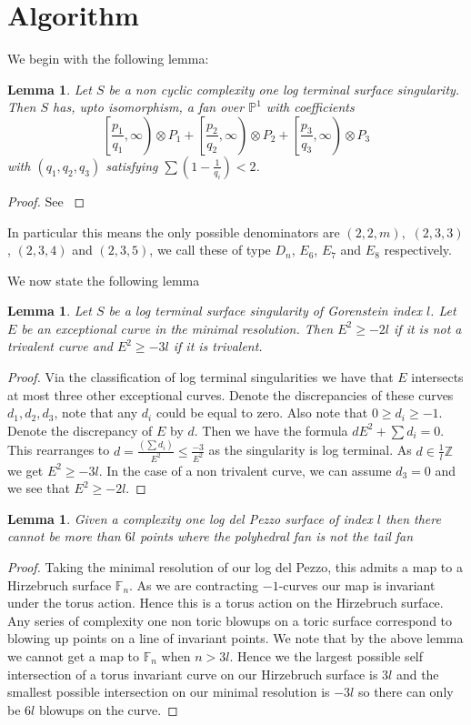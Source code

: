 \documentclass[12pt,a4paper]{book}      %
\newtheorem{lem}[thm]{Lemma}
\theoremstyle{definition}
\begin{document}
\section{Algorithm}
We begin with the following lemma:
\begin{lem}{\cite{Suss}}
Let $S$ be a non cyclic complexity one log terminal surface singularity. Then $S$ has, upto isomorphism, a fan over $\mathbb{P}^1$ with coefficients
\[
\left[\frac{p_1}{q_1}, \infty \right) \otimes P_1 + \left[ \frac{p_2}{q_2}, \infty \right) \otimes P_2 + \left[ \frac{p_3}{q_3}, \infty \right) \otimes P_3
\]
with $(q_1, q_2, q_3)$ satisfying $\sum(1 - \frac{1}{q_i}) < 2$.
\end{lem}
\begin{proof}
See \cite{Suss}
\end{proof}
In particular this means the only possible denominators are $(2,2,m),$ $(2,3,3)$, $(2,3,4)$ and $(2,3,5)$, we call these of type $D_n$, $E_6$, $E_7$ and $E_8$ respectively. 

We now state the following  lemma
\begin{lem}{\label{trivalent}}
Let $S$ be a log terminal surface singularity of Gorenstein index $l$. Let $E$ be an exceptional curve in the minimal resolution. Then $E^2 \geq -2l$ if it is not a trivalent curve and $E^2 \geq -3l$ if it is trivalent.
\end{lem}
\begin{proof}
Via the classification of log terminal singularities \cite{Br} we have that $E$ intersects at most three other exceptional curves. Denote the discrepancies of these curves $d_1, d_2, d_3$, note that any $d_i$ could be equal to zero. Also note that $0 \geq d_i \geq -1$. Denote the discrepancy of $E$ by $d$. Then we have the formula $dE^2 + \sum d_i = 0$.   This rearranges to $d = \frac{(\sum d_i)}{E^2} \leq \frac{-3}{E^2}$ as the singularity is log terminal. As $d \in \frac{1}{l} \mathbb{Z}$ we get $E^2 \geq -3l$. In the case of a non trivalent curve, we can assume $d_3 = 0$ and we see that $E^2 \geq -2l$.
\end{proof}



\begin{lem}
Given a complexity one log del Pezzo surface of index $l$ then there cannot be more than $6l$ points where the polyhedral fan is not the tail fan
\end{lem}
\begin{proof}
Taking the minimal resolution of our log del Pezzo, this admits a map to a Hirzebruch surface $\mathbb{F}_n$. As we are contracting $-1$-curves our map is invariant under the torus action. Hence this is a torus action on the Hirzebruch surface. Any series of complexity one non toric blowups on a toric surface correspond to blowing up points on a line of invariant points. We note that by the above lemma we cannot get a map to $\mathbb{F}_n$ when $n > 3l$. Hence we the largest possible self intersection of a torus invariant curve on our Hirzebruch surface is $3l$ and the smallest possible intersection on our minimal resolution is $-3l$ so there can only be $6l$ blowups on the curve.
\end{proof}
\end{document}
